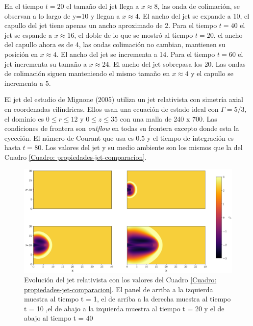 \documentclass[12pt,a4paper]{book}
\begin{document}
En el tiempo $t = 20$ el tamaño del jet llega a $x \approx 8$, las onda de colimación, {\color {red} se observan a 
lo largo de y=10} y llegan a $x \approx 4$. El ancho del jet se expande a 10, el capullo del jet tiene
apenas un ancho aproximado de 2. Para el tiempo $t = 40$ el jet se espande a 
$x \approx 16$, el doble de lo que se mostró al tiempo $t = 20$. el ancho del capullo ahora es de 
4, las ondas colimación no cambian, mantienen su posición en $x \approx 4$. El ancho del jet se 
incrementa a 14. Para el tiempo $t = 60$ el jet incrementa su tamaño a $x \approx 24$. 
El ancho del
jet sobrepasa los 20. Las ondas de colimación siguen manteniendo el mismo tamaño en $x \approx 4$
y el capullo se incrementa a 5.






El jet del estudio de Mignone (2005) utiliza un jet relativista con simetría axial en 
coordenadas cilíndricas. Ellos usan una ecuación de estado ideal con $\Gamma = 5/3$, el dominio es 
$0 \leqslant r \leqslant 12$ y $0 \leqslant z \leqslant 35$ con una malla de 240 x 700. Las condiciones de
frontera son \emph{outflow} en todas su frontera excepto donde esta la eyección. El número de Courant que
usa es 0.5 y el tiempo de integración es hasta $t = 80$. Los valores del jet y su medio ambiente son los
mismos que la del Cuadro \ref{Cuadro: propiedades-jet-comparacion}.

\begin{figure}
  \centering
  \includegraphics[width=1\textwidth]{./Figuras/jet/evolucion/evolucion.png}
    \caption{Evolución del jet relativista con los valores del Cuadro 
    \ref{Cuadro: propiedades-jet-comparacion}. El panel de arriba a la izquierda muestra al 
    tiempo t = 1, el de arriba a la derecha muestra al tiempo t = 10
    ,el de abajo a la izquierda muestra al tiempo t = 20 y el de abajo al tiempo t = 40 }\label{fig:evolucion_temporal_del_jet}
\end{figure}
\end{document}
